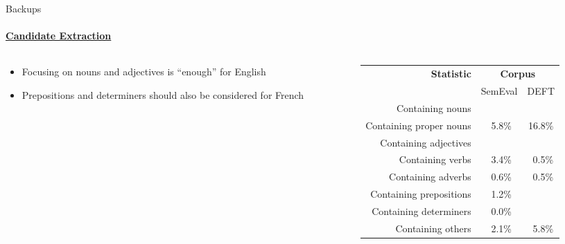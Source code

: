   \begin{frame}[label=candidate_extraction_backup]{Backups}
    \framesubtitle{\hyperlink{topicrank}{Candidate Extraction}}

    \begin{columns}
      \begin{column}{0.45\textwidth}
        \begin{itemize}
          \item{Focusing on nouns and adjectives is ``enough'' for English}
          \item{Prepositions and determiners should also be considered for
                French}
        \end{itemize}
      \end{column}

      \begin{column}{0.55\textwidth}
        \begin{center}
          \scriptsize
          \begin{tabular}{rcc}
            \toprule
            \multirow{2}{*}[-2pt]{\textbf{Statistic}} & \multicolumn{2}{c}{\textbf{Corpus}}\\
            \cmidrule{2-3}
            & SemEval & DEFT\\
            \midrule
            Containing nouns & \cellcolor{pink}{95.9\%} & \cellcolor{pink}{79.3\%}\\
            Containing proper nouns & $~~$5.8\% & 16.8\%\\
            Containing adjectives & \cellcolor{pink}{40.5\%} & \cellcolor{pink}{28.8\%}\\
            Containing verbs & $~~$3.4\% & $~~$0.5\%\\
            Containing adverbs & $~~$0.6\% & $~~$0.5\%\\
            Containing prepositions & $~~$1.2\% & \cellcolor{cyan!20}{12.7\%}\\
            Containing determiners & $~~$0.0\% & \cellcolor{cyan!20}{$~~$8.1\%}\\
            Containing others & $~~$2.1\% & $~~$5.8\%\\
            \bottomrule
          \end{tabular}
        \end{center}
      \end{column}
    \end{columns}
  \end{frame}

